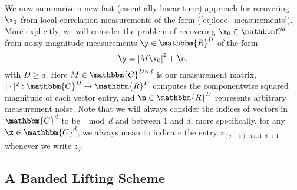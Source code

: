 %
%
We now summarize a new %
fast (essentially linear-time) approach for recovering $\x_0$ from local
correlation measurements of the form (\ref{eq:loco_measurements}). 
More explicitly, we will consider the problem of recovering $\x_0 \in \mathbbm C^d$ from noisy
magnitude measurements $\y \in \mathbbm{R}^D$ of the form 
%
\begin{equation}
    \y = \left | M \x_0 \right |^2 + \n, 
    \label{equ:MeasModel}
\end{equation}
%
with $D \geq d$.  Here $M \in \mathbbm{C}^{D \times d}$ is our
measurement matrix, $| \cdot |^2: \mathbbm{C}^D \rightarrow
\mathbbm{R}^D$ computes the  componentwise squared magnitude of each
vector entry, and $\n \in \mathbbm{R}^D$ represents arbitrary
measurement noise.  Note that we will always consider the indices of vectors in
$\mathbbm{C}^d$ to be $\mod d$ and between $1$ and $d$; more
specifically, for any $\z \in \mathbbm{C}^d$, we always mean to indicate the entry 
$z_{(j-1) \mod d \ + 1}$ whenever we write $z_j$.


\subsection{A Banded Lifting Scheme}
\label{sec:LiftToBandedMatrix}

